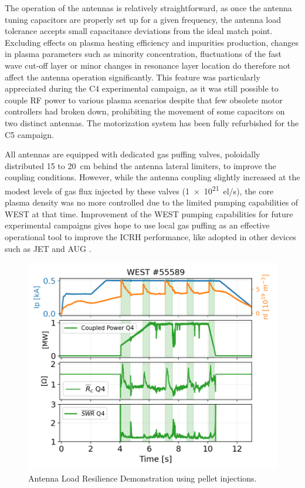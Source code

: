 \documentclass[12p]{iopart}
\begin{document}
The operation of the antennas is relatively straightforward, as once the antenna tuning capacitors are properly set up for a given frequency, the antenna load tolerance accepts small capacitance deviations from the ideal match point. Excluding effects on plasma heating efficiency and impurities production, changes in plasma parameters such as minority concentration, fluctuations of the fast wave cut-off layer or minor changes in resonance layer location do therefore not affect the antenna operation significantly. This feature was particularly appreciated during the C4 experimental campaign, as it was still possible to couple RF power to various plasma scenarios despite that few obsolete motor controllers had broken down, prohibiting the movement of some capacitors on two distinct antennas. The motorization system has been fully refurbished for the C5 campaign. 

All antennas are equipped with dedicated gas puffing valves, poloidally distributed 15 to \SI{20}{\centi\meter} behind the antenna lateral limiters, to improve the coupling conditions. However, while the antenna coupling slightly increased at the modest levels of gas flux injected by these valves (\SI{1e21}{el/\second}), the core plasma density was no more controlled due to the limited pumping capabilities of WEST at that time. Improvement of the WEST pumping capabilities for future experimental campaigns gives hope to use local gas puffing as an effective operational tool to improve the ICRH performance, like adopted in other devices such as JET and AUG \cite{jacquet2016, lerche2016}.

\begin{figure}
	\centering
	\includegraphics[width=0.95\linewidth]{figures/WEST_IC_55589_summary_pellet}
	\caption{Antenna Load Resilience Demonstration using pellet injections.}
	\label{fig:westic55589summarypellet}
\end{figure}
\end{document}
